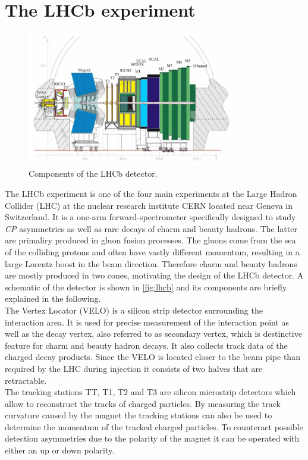 \section{The LHCb experiment}
\begin{figure}[!htb]
  \centering
  \includegraphics[width=0.8\textwidth]{graphics/lhcb.png}
  \caption{Components of the LHCb detector. \cite{Collaboration_2008}}
  \label{fig:lhcb}
\end{figure}
The LHCb experiment is one of the four main experiments at the Large Hadron Collider (LHC)\cite{Evans_2008} at the nuclear research institute CERN located near Geneva in Switzerland. It is a one-arm forward-spectrometer specifically designed to study \textit{CP} asymmetries as well as rare decays of charm and beauty hadrons. The latter are primaliry produced in gluon fusion processes. The gluons come from the sea of the colliding protons and often have vastly different momentum, resulting in a large Lorentz boost in the beam direction. Therefore charm and beauty hadrons are mostly produced in two cones, motivating the design of the LHCb detector. A schematic of the detector is shown in \autoref{fig:lhcb} and its components are briefly explained in the following.\\

The Vertex Locator (VELO) is a silicon strip detector surrounding the interaction area. It is used for precise measurement of the interaction point as well as the decay vertex, also referred to as secondary vertex, which is destinctive feature for charm and beauty hadron decays. It also collects track data of the charged decay products. Since the VELO is located closer to the beam pipe than required by the LHC during injection it consists of two halves that are retractable.\\

The tracking stations TT, T1, T2 and T3 are silicon microstrip detectors which allow to reconstruct the tracks of charged particles. By measuring the track curvature caused by the magnet the tracking stations can also be used to determine the momentum of the tracked charged particles. To counteract possible detection asymmetries due to the polarity of the magnet it can be operated with either an up or down polarity.\\

